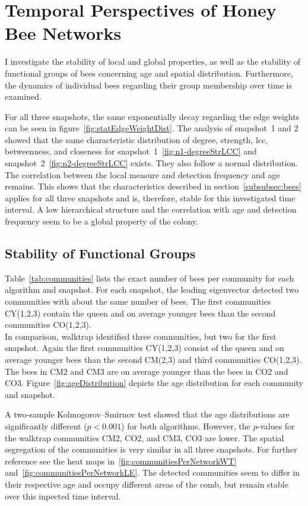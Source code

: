\section{Temporal Perspectives of Honey Bee Networks}
I investigate the stability of local and global properties, as well as the stability of functional groups of bees concerning age and spatial distribution. Furthermore, the dynamics of individual bees regarding their group membership over time is examined.

For all three snapshots, the same exponentially decay regarding the edge weights can be seen in figure~\ref{fig:statEdgeWeightDist}.
The analysis of snapshot~1 and 2 showed that the same characteristic distribution of degree, strength, lcc, betweenness, and closeness for snapshot~1~\ref{fig:n1-degreeStrLCC} and snapshot~2~\ref{fig:n2-degreeStrLCC} exists. They also follow a normal distribution. The correlation between the local measure and detection frequency and age remains.
This shows that the characteristics described in section~\ref{subsubsec:bees} applies for all three snapshots and is, therefore, stable for this investigated time interval. A low hierarchical structure and the correlation with age and detection frequency seem to be a global property of the colony.

\subsection{Stability of Functional Groups}
Table~\ref{tab:communities} lists the exact number of bees per community for each algorithm and snapshot.
For each snapshot, the leading eigenvector detected two communities with about the same number of bees.
The first communities CY(1,2,3) contain the queen and on average younger bees than the second communities CO(1,2,3).\\
In comparison, walktrap identified three communities, but two for the first snapshot.
Again the first communities CY(1,2,3) consist of the queen and on average younger bees than the second CM(2,3) and third communities CO(1,2,3).
The bees in CM2 and CM3 are on average younger than the bees in CO2 and CO3.
Figure~\ref{fig:ageDistribution} depicts the age distribution for each community and snapshot.

A two-sample Kolmogorov–Smirnov test showed that the age distributions are significantly different ($p< 0.001$) for both algorithms. However, the $p$-values for the walktrap communities CM2, CO2, and CM3, CO3 are lower.
The spatial segregation of the communities is very similar in all three snapshots. For further reference see the heat maps in~\ref{fig:communitiesPerNetworkWT} and~\ref{fig:communitiesPerNetworkLE}.
The detected communities seem to differ in their respective age and occupy different areas of the comb, but remain stable over this inpected time interval.

